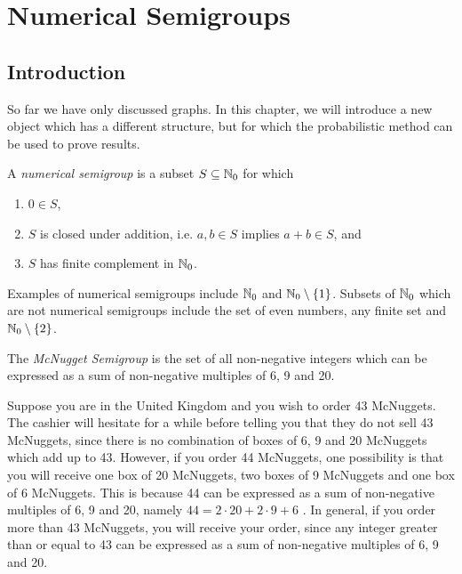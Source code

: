 \chapter{Numerical Semigroups}\label{chap:smgs}

\section{Introduction}\label{sec:smgps:intro}

So far we have only discussed graphs. In this chapter, we will introduce a new object which has a different structure, but for which the probabilistic method can be used to prove results. \par

\begin{definition} \cite{rosales2009numerical}
    A \textit{numerical semigroup} is a subset $S \subseteq \mathbb{N}_{0}$ for which 
    \begin{enumerate}
        \item $0 \in S$,
        \item $S$ is closed under addition, i.e. $a, b \in S$ implies $a + b \in S$, and
        \item $S$ has finite complement in $\mathbb{N}_{0}$.
    \end{enumerate}
\end{definition}

Examples of numerical semigroups include $\mathbb{N}_{0}$ and $\mathbb{N}_{0} \setminus \{1\}$. Subsets of $\mathbb{N}_0$ which are not numerical semigroups include the set of even numbers, any finite set and $\mathbb{N}_0 \setminus \{2\}$. \par

\begin{example}\label{ex:smgps:mcnugget}
    The \textit{McNugget Semigroup} is the set of all non-negative integers which can be expressed as a sum of non-negative multiples of 6, 9 and 20. 
\end{example}

Suppose you are in the United Kingdom and you wish to order 43 McNuggets. The cashier will hesitate for a while before telling you that they do not sell 43 McNuggets, since there is no combination of boxes of 6, 9 and 20 McNuggets which add up to 43. However, if you order 44 McNuggets, one possibility is that you will receive one box of 20 McNuggets, two boxes of 9 McNuggets and one box of 6 McNuggets. This is because 44 can be expressed as a sum of non-negative multiples of 6, 9 and 20, namely $44 = 2 \cdot 20 + 2 \cdot 9 + 6$ \cite{youtube}. In general, if you order more than 43 McNuggets, you will receive your order, since any integer greater than or equal to 43 can be expressed as a sum of non-negative multiples of 6, 9 and 20. \par

